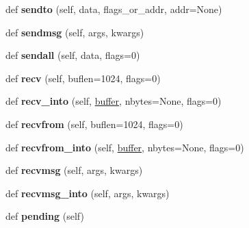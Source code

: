 \begin{DoxyCompactItemize}
def {\bfseries sendto} (self, data, flags\+\_\+or\+\_\+addr, addr=None)
\item 
\mbox{\label{classgevent_1_1__ssl3_1_1_s_s_l_socket_a9a572827a7eb79cf22d7a916996f5b9f}} 
def {\bfseries sendmsg} (self, args, kwargs)
\item 
\mbox{\label{classgevent_1_1__ssl3_1_1_s_s_l_socket_a23a1b1632eb8f55e6932d3f0d6a7db25}} 
def {\bfseries sendall} (self, data, flags=0)
\item 
\mbox{\label{classgevent_1_1__ssl3_1_1_s_s_l_socket_ad30f9e836243b40c2e0ab43c4de6927a}} 
def {\bfseries recv} (self, buflen=1024, flags=0)
\item 
\mbox{\label{classgevent_1_1__ssl3_1_1_s_s_l_socket_a3377dff7c731af780c42e901750290d2}} 
def {\bfseries recv\+\_\+into} (self, \hyperlink{structbuffer}{buffer}, nbytes=None, flags=0)
\item 
\mbox{\label{classgevent_1_1__ssl3_1_1_s_s_l_socket_a6230d95e547497cefc0b0ba268e98e32}} 
def {\bfseries recvfrom} (self, buflen=1024, flags=0)
\item 
\mbox{\label{classgevent_1_1__ssl3_1_1_s_s_l_socket_a76026b5ab1d86acbda6ba9bc27fa75e5}} 
def {\bfseries recvfrom\+\_\+into} (self, \hyperlink{structbuffer}{buffer}, nbytes=None, flags=0)
\item 
\mbox{\label{classgevent_1_1__ssl3_1_1_s_s_l_socket_a1f57f65e5d117437e1688b9b9a383473}} 
def {\bfseries recvmsg} (self, args, kwargs)
\item 
\mbox{\label{classgevent_1_1__ssl3_1_1_s_s_l_socket_a93cf27ac32259b8bf52de230530f06ee}} 
def {\bfseries recvmsg\+\_\+into} (self, args, kwargs)
\item 
\mbox{\label{classgevent_1_1__ssl3_1_1_s_s_l_socket_aee86ac5bf295b5b5758288c8c0c11ef5}} 
def {\bfseries pending} (self)
\item 

\end{DoxyCompactItemize}
